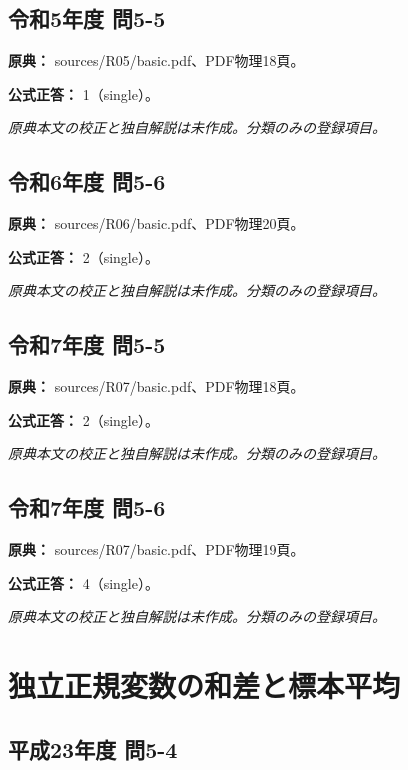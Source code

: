 \subsection{令和5年度 問5-5}
\label{q:r05-reg-basic-5-5}

\noindent\textbf{原典：} sources/R05/basic.pdf、PDF物理18頁。

\textbf{公式正答：} 1（single）。

\par\textit{原典本文の校正と独自解説は未作成。分類のみの登録項目。}

\subsection{令和6年度 問5-6}
\label{q:r06-reg-basic-5-6}

\noindent\textbf{原典：} sources/R06/basic.pdf、PDF物理20頁。

\textbf{公式正答：} 2（single）。

\par\textit{原典本文の校正と独自解説は未作成。分類のみの登録項目。}

\subsection{令和7年度 問5-5}
\label{q:r07-reg-basic-5-5}

\noindent\textbf{原典：} sources/R07/basic.pdf、PDF物理18頁。

\textbf{公式正答：} 2（single）。

\par\textit{原典本文の校正と独自解説は未作成。分類のみの登録項目。}

\subsection{令和7年度 問5-6}
\label{q:r07-reg-basic-5-6}

\noindent\textbf{原典：} sources/R07/basic.pdf、PDF物理19頁。

\textbf{公式正答：} 4（single）。

\par\textit{原典本文の校正と独自解説は未作成。分類のみの登録項目。}

\section{独立正規変数の和差と標本平均}

\subsection{平成23年度 問5-4}
\label{q:h23-reg-basic-5-4}

